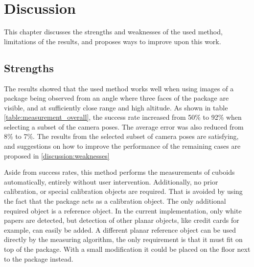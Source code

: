 \chapter{Discussion}
This chapter discusses the strengths and weaknesses of the used method, limitations of the results, and proposes ways to improve upon this work.

\section{Strengths}
The results showed that the used method works well when using images of a package being observed from an angle where three faces of the package are visible, and at sufficiently close range and high altitude. 
As shown in table \ref{table:measurement_overall}, the success rate increased from 50\% to 92\% when selecting a subset of the camera poses.
The average error was also reduced from 8\% to 7\%.
The results from the selected subset of camera poses are satisfying, and suggestions on how to improve the performance of the remaining cases are proposed in \ref{discussion:weaknesses}

Aside from success rates, this method performs the measurements of cuboids automatically, entirely without user intervention.
Additionally, no prior calibration, or special calibration objects are required.
That is avoided by using the fact that the package acts as a calibration object.
The only additional required object is a reference object.
In the current implementation, only white papers are detected, but detection of other planar objects, like credit cards for example, can easily be added.
A different planar reference object can be used directly by the measuring algorithm, the only requirement is that it must fit on top of the package.
With a small modification it could be placed on the floor next to the package instead.






